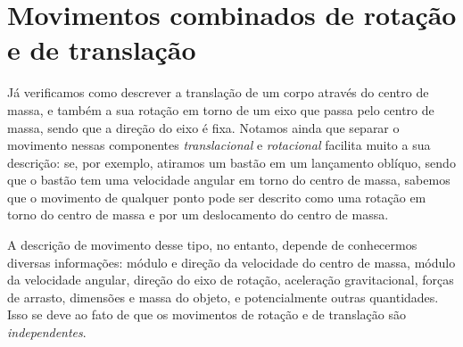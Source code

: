 \section{Movimentos combinados de rotação e de translação}


Já verificamos como descrever a translação de um corpo através do centro de massa, e também a sua  rotação em torno de um eixo que passa pelo centro de massa, sendo que a direção do eixo é fixa. Notamos ainda que separar o movimento nessas componentes \emph{translacional} e \emph{rotacional} facilita muito a sua descrição: se, por exemplo, atiramos um bastão em um lançamento oblíquo, sendo que o bastão tem uma velocidade angular em torno do centro de massa, sabemos que o movimento de qualquer ponto pode ser descrito como uma rotação em torno do centro de massa e por um deslocamento do centro de massa.

A descrição de movimento desse tipo, no entanto, depende de conhecermos diversas informações: módulo e direção da velocidade do centro de massa, módulo da velocidade angular, direção do eixo de rotação, aceleração gravitacional, forças de arrasto, dimensões e massa do objeto, e potencialmente outras quantidades. Isso se deve ao fato de que os movimentos de rotação e de translação são \emph{independentes}.

